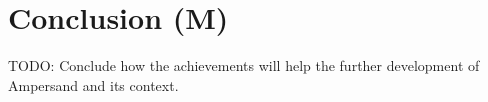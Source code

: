
\section{Conclusion (M)}
\label{sec:conclusion}
TODO: Conclude how the achievements will help the further development of Ampersand and its context.
